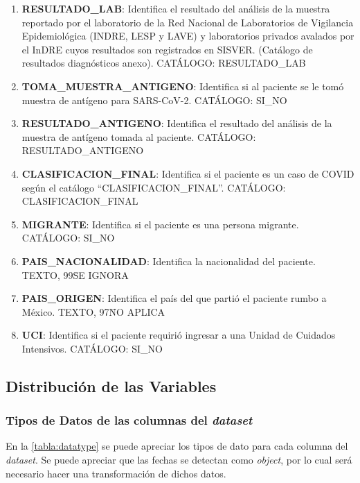 \begin{enumerate}
	\item \textbf{RESULTADO\_LAB}: Identifica el resultado del análisis de la muestra reportado por el  laboratorio de la Red Nacional de Laboratorios de Vigilancia Epidemiológica (INDRE, LESP y LAVE) y laboratorios privados avalados por el InDRE cuyos resultados son registrados en SISVER. (Catálogo de resultados diagnósticos anexo). CATÁLOGO: RESULTADO\_LAB
	\item \textbf{TOMA\_MUESTRA\_ANTIGENO}: Identifica si al paciente se le tomó muestra de antígeno para SARS-CoV-2. CATÁLOGO: SI\_NO
	\item \textbf{RESULTADO\_ANTIGENO}: Identifica el resultado del análisis de la muestra de antígeno tomada al paciente. CATÁLOGO: RESULTADO\_ANTIGENO
	\item \textbf{CLASIFICACION\_FINAL}: Identifica si el paciente es un caso de COVID según el catálogo ``CLASIFICACION\_FINAL''. CATÁLOGO: CLASIFICACION\_FINAL
	\item \textbf{MIGRANTE}: Identifica si el paciente es una persona migrante. CATÁLOGO: SI\_NO
	\item \textbf{PAIS\_NACIONALIDAD}: Identifica la nacionalidad del paciente. TEXTO, 99\=SE IGNORA
	\item \textbf{PAIS\_ORIGEN}: Identifica el país del que partió el paciente rumbo a México. TEXTO, 97\=NO APLICA
	\item \textbf{UCI}: Identifica si el paciente requirió ingresar a una Unidad de Cuidados Intensivos. CATÁLOGO: SI\_NO
\end{enumerate}

\clearpage

\subsection{Distribución de las Variables}
\subsubsection{Tipos de Datos de las columnas del \emph{dataset}}
En la \ref{tabla:datatype} se puede apreciar los tipos de dato para cada columna del \emph{dataset}. Se puede apreciar que las fechas se detectan como \emph{object}, por lo cual será necesario hacer una transformación de dichos datos.

